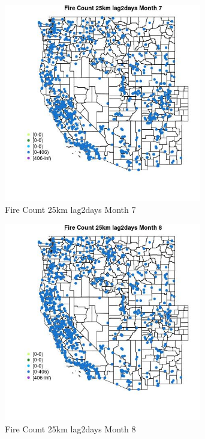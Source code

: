 \begin{figure} 
\centering  
\includegraphics[width=0.77\textwidth]{Code_Outputs/Report_ML_input_PM25_Step4_part_f_de_duplicated_aves_prioritize_24hr_obswNAs_MapObsMo7Fire_Count_25km_lag2days.jpg} 
\caption{\label{fig:Report_ML_input_PM25_Step4_part_f_de_duplicated_aves_prioritize_24hr_obswNAsMapObsMo7Fire_Count_25km_lag2days}Fire Count 25km lag2days Month 7} 
\end{figure} 
 

\begin{figure} 
\centering  
\includegraphics[width=0.77\textwidth]{Code_Outputs/Report_ML_input_PM25_Step4_part_f_de_duplicated_aves_prioritize_24hr_obswNAs_MapObsMo8Fire_Count_25km_lag2days.jpg} 
\caption{\label{fig:Report_ML_input_PM25_Step4_part_f_de_duplicated_aves_prioritize_24hr_obswNAsMapObsMo8Fire_Count_25km_lag2days}Fire Count 25km lag2days Month 8} 
\end{figure} 
 

